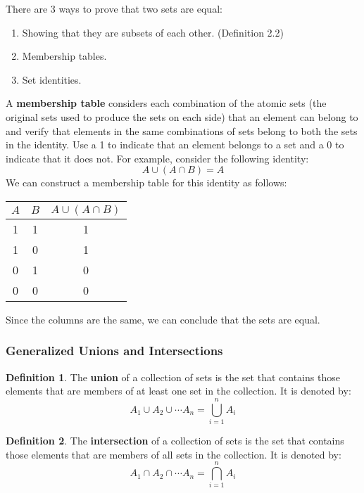 \documentclass[article, 11pt]{article}
\theoremstyle{definition}
\newtheorem{definition}{Definition}[subsubsection]
\newcommand{\unite}{\cup}
\newcommand{\inter}{\cap}
\begin{document}
    There are 3 ways to prove that two sets are equal:
    \begin{enumerate}
        \item Showing that they are subsets of each other. (Definition 2.2)
        \item Membership tables.
        \item Set identities.
    \end{enumerate}
    A \textbf{membership table} considers each combination of the atomic sets (the original sets used to produce the sets on each side) that an element can belong to and verify that elements in the same combinations of sets belong to both the sets in the identity. Use a 1 to indicate that an element belongs to a set and a 0 to indicate that it does not. For example, consider the following identity:
    \begin{equation*}
        A \unite (A \inter B) = A
    \end{equation*}
    We can construct a membership table for this identity as follows:
    \begin{center}
        \begin{tabular}{|c|c|c|}
            \hline
            $A$ & $B$ & $A \unite (A \inter B)$ \\
            \hline
            1 & 1 & 1 \\
            1 & 0 & 1 \\
            0 & 1 & 0 \\
            0 & 0 & 0 \\
            \hline
        \end{tabular}
    \end{center}
    Since the columns are the same, we can conclude that the sets are equal.
    \subsubsection{Generalized Unions and Intersections}
    \begin{definition}
        The \textbf{union} of a collection of sets is the set that contains those elements that are members of at least one set in the collection. It is denoted by:
        \begin{equation*}
            A_1 \unite A_2 \unite \cdots A_n = \bigcup_{i=1}^{n} A_i
        \end{equation*}
    \end{definition}
    \begin{definition}
        The \textbf{intersection} of a collection of sets is the set that contains those elements that are members of all sets in the collection. It is denoted by:
        \begin{equation*}
            A_1 \inter A_2 \inter \cdots A_n = \bigcap_{i=1}^{n} A_i
        \end{equation*}
    \end{definition}
\end{document}
